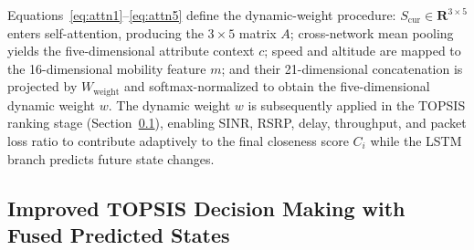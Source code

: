 \documentclass[preprint,12pt]{elsarticle}
\begin{document}
Equations~\eqref{eq:attn1}--\eqref{eq:attn5} define the dynamic-weight procedure: $S_{\mathrm{cur}}\in\mathbf{R}^{3\times5}$ enters self-attention, producing the $3\times5$ matrix $A$; cross-network mean pooling yields the five-dimensional attribute context $c$; speed and altitude are mapped to the 16-dimensional mobility feature $m$; and their 21-dimensional concatenation is projected by $W_{\mathrm{weight}}$ and softmax-normalized to obtain the five-dimensional dynamic weight $w$. The dynamic weight $w$ is subsequently applied in the TOPSIS ranking stage (Section~\ref{sec:topsis}), enabling SINR, RSRP, delay, throughput, and packet loss ratio to contribute adaptively to the final closeness score $C_i$ while the LSTM branch predicts future state changes.

\subsection{Improved TOPSIS Decision Making with Fused Predicted States}\label{sec:topsis}
\end{document}

